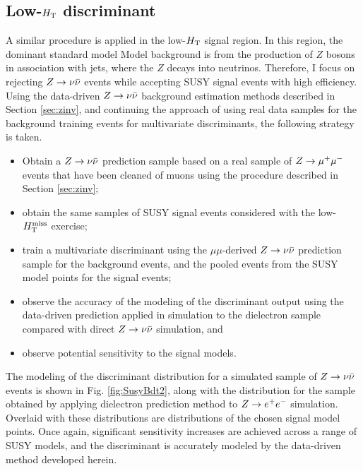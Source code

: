 \FloatBarrier
\subsection{Low-$H_{\rm T}$ discriminant}
\label{sec:chosentarget}
A similar procedure is applied in the low-$H_{\rm T}$ signal region. In this region, the dominant standard model Model background is from the production of $Z$ bosons in association with jets, where the $Z$ decays into neutrinos. Therefore, I focus on rejecting $Z\rightarrow \nu\bar{\nu}$ events while accepting SUSY signal events with high efficiency. Using the data-driven $Z\rightarrow \nu\bar{\nu}$ background estimation methods described in Section \ref{sec:zinv}, and continuing the approach of using real data samples for the background training events for multivariate discriminants, the following strategy is taken.
\begin{itemize}
\item Obtain a $Z\rightarrow \nu\bar{\nu}$ prediction sample based on a real sample of $Z\rightarrow \mu^+\mu^-$ events that have been cleaned of muons using the procedure described in Section \ref{sec:zinv};
\item obtain the same samples of SUSY signal events considered with the low-$H_{\text{T}}^{\rm miss}$ exercise;
\item train a multivariate discriminant using the $\mu\mu$-derived $Z\rightarrow \nu\bar{\nu}$ prediction sample for the background events, and the pooled events from the SUSY model points for the signal events;
\item observe the accuracy of the modeling of the discriminant output using the data-driven prediction applied in simulation to the dielectron sample compared with direct $Z\rightarrow \nu\bar{\nu}$ simulation, and
\item observe potential sensitivity to the signal models.
\end{itemize}
The modeling of the discriminant distribution for a simulated sample of $Z\rightarrow \nu\bar{\nu}$ events is shown in Fig. \ref{fig:SusyBdt2}, along with the distribution for the sample obtained by applying dielectron prediction method to $Z\rightarrow e^+e^-$ simulation. Overlaid with these distributions are distributions of the chosen signal model points. Once again, significant sensitivity increases are achieved across a range of SUSY models, and the discriminant is accurately modeled by the data-driven method developed herein. 
